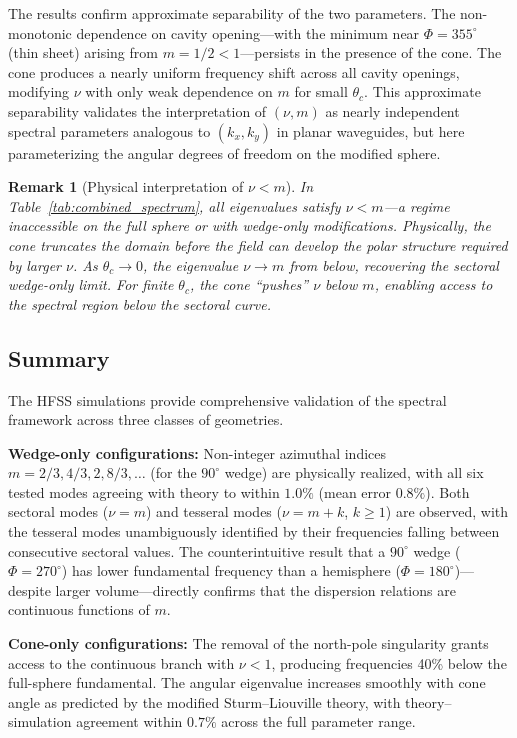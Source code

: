 \documentclass[
  aip,
  amsmath,amssymb,
  preprint
]{revtex4-1}
\newtheorem{remark}{Remark}[section]
\begin{document}
The results confirm approximate separability of the two parameters. The non-monotonic dependence on cavity opening---with the minimum near $\Phi = 355^\circ$ (thin sheet) arising from $m = 1/2 < 1$---persists in the presence of the cone. The cone produces a nearly uniform frequency shift across all cavity openings, modifying $\nu$ with only weak dependence on $m$ for small $\theta_c$. This approximate separability validates the interpretation of $(\nu, m)$ as nearly independent spectral parameters analogous to $(k_x, k_y)$ in planar waveguides, but here parameterizing the angular degrees of freedom on the modified sphere.

\begin{remark}[Physical interpretation of $\nu < m$]
In Table~\ref{tab:combined_spectrum}, all eigenvalues satisfy $\nu < m$---a regime inaccessible on the full sphere or with wedge-only modifications. Physically, the cone truncates the domain before the field can develop the polar structure required by larger $\nu$. As $\theta_c \to 0$, the eigenvalue $\nu \to m$ from below, recovering the sectoral wedge-only limit. For finite $\theta_c$, the cone ``pushes'' $\nu$ below $m$, enabling access to the spectral region below the sectoral curve.
\end{remark}

\subsection{Summary}
\label{subsec:validation_summary}
The HFSS simulations provide comprehensive validation of the spectral framework across three classes of geometries. 

\textbf{Wedge-only configurations:} Non-integer azimuthal indices $m = 2/3, 4/3, 2, 8/3, \ldots$ (for the $90^\circ$ wedge) are physically realized, with all six tested modes agreeing with theory to within $1.0\%$ (mean error $0.8\%$). Both sectoral modes ($\nu = m$) and tesseral modes ($\nu = m + k$, $k \geq 1$) are observed, with the tesseral modes unambiguously identified by their frequencies falling between consecutive sectoral values. The counterintuitive result that a $90^\circ$ wedge ($\Phi = 270^\circ$) has lower fundamental frequency than a hemisphere ($\Phi = 180^\circ$)---despite larger volume---directly confirms that the dispersion relations are continuous functions of $m$.

\textbf{Cone-only configurations:} The removal of the north-pole singularity grants access to the continuous branch with $\nu < 1$, producing frequencies 40\% below the full-sphere fundamental. The angular eigenvalue increases smoothly with cone angle as predicted by the modified Sturm--Liouville theory, with theory--simulation agreement within $0.7\%$ across the full parameter range.
\end{document}
